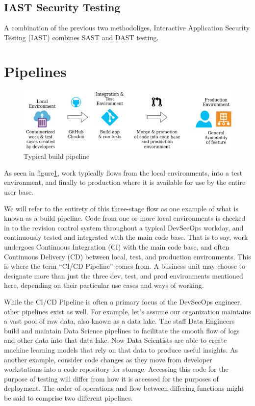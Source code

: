 \subsection{IAST Security Testing}

\justify{}
A combination of the previous two methodoliges, Interactive Application Security Testing (IAST) combines
SAST and DAST testing.

\section{Pipelines}

\begin{figure}[!htb]
\centering
\includegraphics[scale=0.63]{images/flow.png}
\caption{Typical build pipeline}
\label{pipeline}
\end{figure}

\justify{}
As seen in figure\ref{pipeline}, work typically flows from the local environments, into a test
environment, and finally to production where it is available for use by the entire user base.

\justify{}
We will refer to the entirety of this three-stage flow as one example of what is known as a build pipeline.
Code from one or more local environments is checked in to the revision control system throughout a
typical DevSecOps workday, and continuously tested and integrated with the main code base. That is to say, work undergoes
Continuous Integration (CI) with the main code base,
and often Continuous Delivery (CD) between local, test, and production environments. This is
where the term ``CI/CD Pipeline'' comes from. A business unit may choose to designate more than just the three dev, test,
and prod environments mentioned here, depending on their particular use cases and ways of working.

\justify{}
While the CI/CD Pipeline is often a primary focus of the DevSecOps engineer, other pipelines exist as well. For example,
let's assume our organization maintains a vast pool of raw data, also known as a data lake. The staff Data
Engineers build and maintain Data Science pipelines to facilitate the smooth flow
of logs and other data into that data lake. Now Data Scientists are able to create machine learning models that rely on that
data to produce useful insights. As another example, consider code changes as they move from
developer workstations into a code repository for storage. Accessing this code for the purpose of testing will differ from
how it is accessed for the purposes of deployment. The order of operations and flow
between differing functions might be said to comprise two different pipelines.

